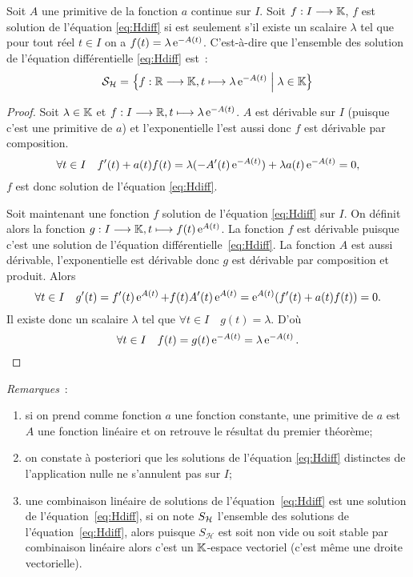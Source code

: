 \begin{theo}
  \label{theo:2}
  Soit \(A\) une primitive de la fonction \(a\) continue sur \(I\). Soit
  \(f:I \longrightarrow{} \mathbb{K}\), \(f\) est solution de l'équation \eqref{eq:Hdiff}
  si est seulement s'il existe un scalaire \(\lambda\) tel que pour tout réel
  \(t \in I\) on a \(f(t) = \lambda \operatorname{e}^{-A(t)}\). C'est-à-dire que l'ensemble
  des solution de l'équation différentielle \eqref{eq:Hdiff} est~:
  \begin{equation}
    \mathcal{S}_{\mathcal{H}} = \left\{f:\mathbb{R} \longrightarrow{} \mathbb{K}, t \longmapsto{} \lambda \operatorname{e}^{-A(t)}\mathrel{}\middle|\mathrel{}\lambda
    \in \mathbb{K}\right\}
  \end{equation}
\end{theo}
\begin{proof}
  Soit \(\lambda \in \mathbb{K}\) et \(f:I \longrightarrow{} \mathbb{R}, t \longmapsto{} \lambda \operatorname{e}^{-A(t)}\).
  \(A\) est dérivable sur \(I\) (puisque c'est une primitive de \(a\)) et
  l'exponentielle l'est aussi donc \(f\) est dérivable par composition.
  \begin{equation}
    \forall t \in I \quad f'(t) + a(t)f(t) = \lambda(-A'(t)\operatorname{e}^{-A(t)}) +
    \lambda a(t)\operatorname{e}^{-A(t)} = 0,
  \end{equation}
  \(f\) est donc solution de l'équation \eqref{eq:Hdiff}.

  Soit maintenant une fonction \(f\) solution de l'équation \eqref{eq:Hdiff}
  sur \(I\). On définit alors la fonction
  \(g:I \longrightarrow{} \mathbb{K}, t \longmapsto{} f(t)\operatorname{e}^{A(t)}\). La fonction \(f\) est dérivable
  puisque c'est une solution de l'équation différentielle~\eqref{eq:Hdiff}. La
  fonction  \(A\) est aussi dérivable, l'exponentielle est dérivable donc
  \(g\) est dérivable par composition et produit. Alors
  \begin{equation}
    \forall t \in I \quad g'(t) = f'(t) \operatorname{e}^{A(t)} +
    f(t)A'(t)\operatorname{e}^{A(t)} = \operatorname{e}^{A(t)}(f'(t) + a(t)f(t))  = 0.
  \end{equation}
  Il existe donc un scalaire \(\lambda\) tel que \(\forall t \in I \quad
  g(t) = \lambda\). D'où
  \begin{equation}
    \forall t \in I \quad f(t) = g(t) \operatorname{e}^{-A(t)} = \lambda \operatorname{e}^{-A(t)}.
  \end{equation}
\end{proof}

\emph{Remarques}~:
\begin{enumerate}
  \item si on prend comme fonction \(a\) une fonction constante, une primitive
    de \(a\) est \(A\) une fonction linéaire et on retrouve le résultat du
    premier théorème;
  \item on constate à posteriori que les solutions de l'équation
    \eqref{eq:Hdiff} distinctes de l'application nulle ne s'annulent pas sur
    \(I\);
  \item une combinaison linéaire de solutions de l'équation~\eqref{eq:Hdiff}
    est une solution de l'équation~\eqref{eq:Hdiff}, si on note \(S_{\mathcal{H}{}}\)
    l'ensemble des solutions de l'équation~\eqref{eq:Hdiff}, alors puisque
    \(S_\mathcal{H} \) est soit non vide ou soit stable par combinaison
    linéaire alors c'est un \(\mathbb{K}\)-espace vectoriel (c'est même une droite
    vectorielle).
\end{enumerate}

